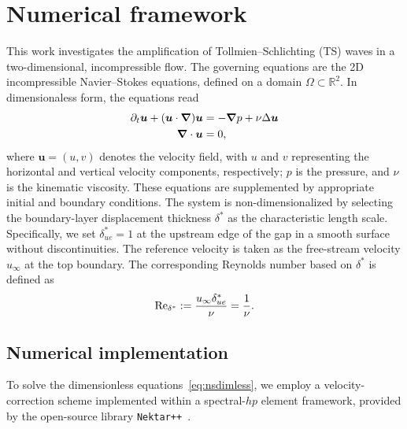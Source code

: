\documentclass[../main.tex]{subfiles}
\begin{document}
\section{Numerical framework}\label{sec:theory}

This work investigates the amplification of Tollmien--Schlichting (TS) waves in a two-dimensional, incompressible flow. The governing equations are the 2D incompressible Navier--Stokes equations, defined on a domain $\Omega \subset \mathbb{R}^2$. In dimensionaless form, the equations read
\begin{equation}
	\begin{aligned}
		\partial_t \vf{u} + (\vf{u} \cdot \vf\nabla) \vf{u} & = -\vf\nabla p + \nu \Delta \vf{u} \\
		\vf\nabla \cdot \vf{u}                              & = 0,
	\end{aligned}
	\label{eq:nsdimless}
\end{equation}
where $\mathbf{u} = (u, v)$ denotes the velocity field, with $u$ and $v$ representing the horizontal and vertical velocity components, respectively; $p$ is the pressure, and $\nu$ is the kinematic viscosity. These equations are supplemented by appropriate initial and boundary conditions. The system is non-dimensionalized by selecting the boundary-layer displacement thickness $\delta^*$ as the characteristic length scale. Specifically, we set $\delta^*_{ue} = 1$ at the upstream edge of the gap in a smooth surface without discontinuities. The reference velocity is taken as the free-stream velocity $u_\infty$ at the top boundary. The corresponding Reynolds number based on $\delta^*$ is defined as
\[
	\text{Re}_{\delta^*} := \frac{u_\infty \delta^*_{ue}}{\nu} = \frac{1}{\nu}.
\]


\subsection{Numerical implementation}\label{sec:numericalimplementation}

To solve the dimensionless equations~\eqref{eq:nsdimless}, we employ a velocity-correction scheme implemented within a spectral-$hp$ element framework, provided by the open-source library \texttt{Nektar++}~\cite{nektaruserguide}.
\end{document}
